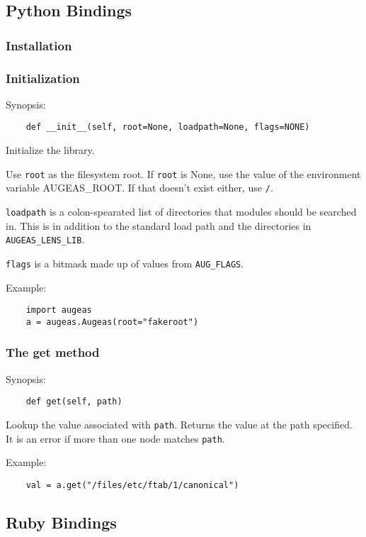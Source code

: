 
\subsection{Python Bindings}


\subsubsection{Installation}

\subsubsection{Initialization}

Synopsis:

\begin{verbatim}
    def __init__(self, root=None, loadpath=None, flags=NONE)
\end{verbatim}

Initialize the library.

Use \verb!root! as the filesystem root. If \verb!root! is None, use the value of the environment variable AUGEAS\_ROOT. If that doesn't exist either, use \verb!/!.

\verb!loadpath! is a colon-spearated list of directories that modules should be searched in. This is in addition to the standard load path and the directories in \verb!AUGEAS_LENS_LIB!.

\verb!flags! is a bitmask made up of values from \verb!AUG_FLAGS!.

Example:

\begin{verbatim}
    import augeas
    a = augeas.Augeas(root="fakeroot")
\end{verbatim}

\subsubsection{The get method}

Synopsis:

\begin{verbatim}
    def get(self, path)
\end{verbatim}

Lookup the value associated with \verb!path!. Returns the value at the path specified. It is an error if more than one node matches \verb!path!.

Example:

\begin{verbatim}
    val = a.get("/files/etc/ftab/1/canonical")
\end{verbatim}

\subsection{Ruby Bindings}





